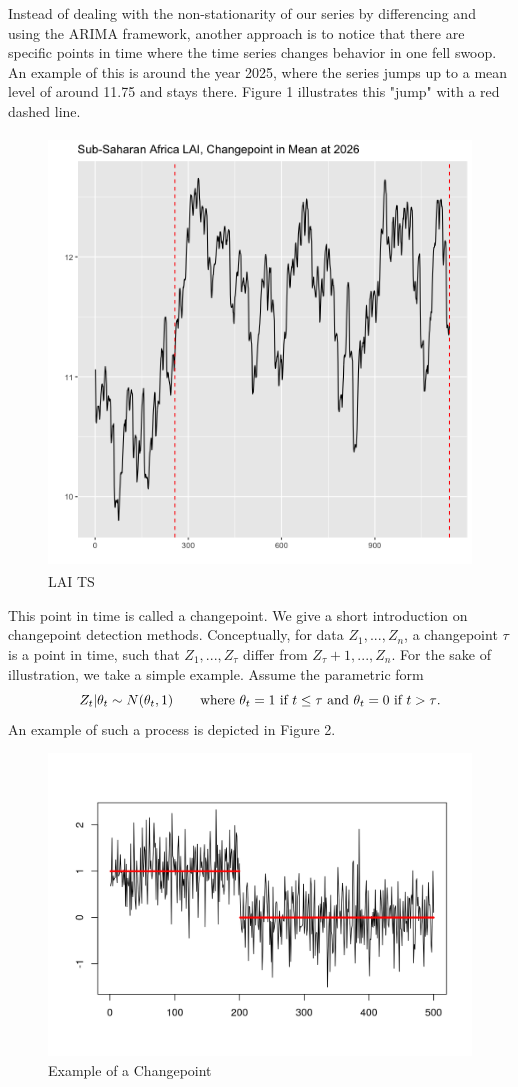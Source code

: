 \documentclass[11pt]{article}
\begin{document}
Instead of dealing with the non-stationarity of our series by differencing and using the ARIMA framework, another approach is to notice that there are specific points in time where the time series changes behavior in one fell swoop. An example of this is around the year 2025, where the series jumps up to a mean level of around 11.75 and stays there. Figure 1 illustrates this "jump" with a red dashed line.
\begin{figure}[h]
	\centering
	\includegraphics[width=5in, height=4.5in]{../img/changepoint_LAI.png}
	\caption{LAI TS}
\end{figure}

This point in time is called a changepoint. We give a short introduction on changepoint detection methods.\clearpage
{} Conceptually, for data $Z_1,...,Z_n$, a changepoint $\tau$ is a point in time, such that $Z_1,...,Z_\tau$ differ from  $Z_\tau+1,...,Z_n$. For the sake of illustration, we take a simple example. Assume the parametric form
\begin{equation*}
	Z_t|\theta_t\sim N(\theta_t,1) \tag*{where $\theta_t=1 ~\text{if}~ t\leq\tau$ and $\theta_t=0 ~\text{if}~ t>\tau$}.
\end{equation*} An example of such a process is depicted in Figure 2.
\begin{figure}[h]
	\centering
	\includegraphics[width=0.75\linewidth]{../img/changepointex.png}
	\caption{Example of a Changepoint}
\end{figure}
\end{document}
